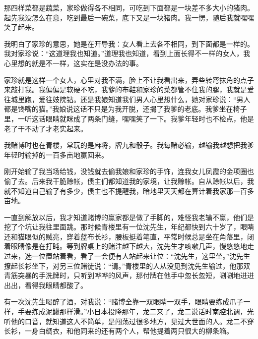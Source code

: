 \documentclass[12pt,UTF8]{ctexbook}
\begin{document}
那四样菜都是蔬菜，家珍做得各不相同，可吃到下面都是一块差不多大小的猪肉。起先我没怎么在意，吃到最后一碗菜，底下又是一块猪肉。我一愣，随后我就嘿嘿笑了起来。

我明白了家珍的意思，她是在开导我：女人看上去各不相同，到下面都是一样的。我对家珍说：“这道理我也知道。”道理我也知道，看到上面长得不一样的女人，我心里想的就是不一样，这实在是没办法的事。

家珍就是这样一个女人，心里对我不满，脸上不让我看出来，弄些转弯抹角的点子来敲打我。我偏偏是软硬不吃，我爹的布鞋和家珍的菜都管不住我的腿，我就是爱往城里跑，爱往妓院钻。还是我娘知道我们男人心里想什么，她对家珍说：“男人都是馋嘴的猫。”我娘说这话不只是为我开脱，还揭了我爹的老底。我爹坐在椅子里，一听这话眼睛就眯成了两条门缝，嘿嘿笑了一下。我爹年轻时也不检点，他是老了干不动了才老实起来。

我赌博时也在青楼，常玩的是麻将，牌九和骰子。我每赌必输，越输我越想把我爹年轻时输掉的一百多亩地赢回来。

刚开始输了我当场给钱，没钱就去偷我娘和家珍的手饰，连我女儿凤霞的金项圈也偷了去。后来我干脆赊帐，债主们都知道我的家境，让我赊帐。自从赊帐以后，我就不知道自己输了有多少，债主也不提醒我，暗地里天天都在算计着我家那一百多亩地。

一直到解放以后，我才知道赌博的赢家都是做了手脚的，难怪我老输不赢，他们是挖了个坑让我往里面跳。那时候青楼里有一位沈先生，年纪都快到六十岁了，眼睛还和猫眼似的贼亮，穿着蓝布长衫，腰板挺着笔直，平常时候总是坐在角落里，闭着眼睛像是在打盹。等到牌桌上的赌注越下越大，沈先生才咳嗽几声，慢悠悠地走过来，选一位置站着看，看了一会便有人站起来让位：“沈先生，这里坐。”沈先生撩起长衫坐下，对另三位赌徒说：“请。”青楼里的人从没见到沈先生输过，他那双青筋突暴的手洗牌时，只听到哗哗的风声，那付牌在他手中忽长忽短，唰唰地进进出出，看得我眼睛都酸了。

有一次沈先生喝醉了酒，对我说：“赌博全靠一双眼睛一双手，眼睛要练成爪子一样，手要练成泥鳅那样滑。”小日本投降那年，龙二来了，龙二说话时南腔北调，光听他的口音，就知道这人不简单，是闯荡过很多地方，见过大世面的人。龙二不穿长衫，一身白绸衣，和他同来的还有两个人，帮他提着两只很大的柳条箱。
\end{document}
